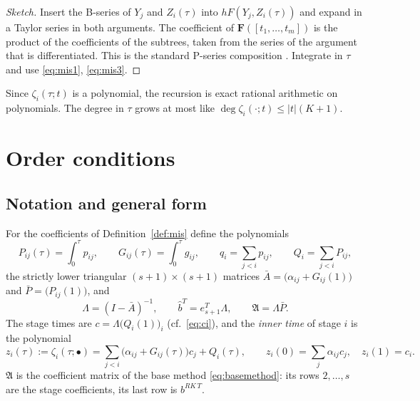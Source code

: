 \documentclass[11pt,a4paper]{article}
\theoremstyle{definition}
\theoremstyle{remark}
\begin{document}
\begin{proof}[Sketch]
Insert the B-series of $Y_j$ and $Z_i(\tau)$ into $hF(Y_j,Z_i(\tau))$
and expand in a Taylor series in both arguments. The coefficient of
$\mathbf F([t_1,\dots,t_m])$ is the product of the coefficients of the
subtrees, taken from the series of the argument that is differentiated.
This is the standard P-series composition \cite{HairerNorsettWanner1993}.
Integrate in $\tau$ and use \eqref{eq:mis1}, \eqref{eq:mis3}.
\end{proof}

Since $\zeta_i(\tau;t)$ is a polynomial, the recursion is exact
rational arithmetic on polynomials. The degree in $\tau$ grows at most
like $\deg\zeta_i(\cdot;t)\le |t|(K+1)$.

\section{Order conditions}
\label{sec:orderconditions}

\subsection{Notation and general form}

For the coefficients of Definition~\ref{def:mis} define the polynomials
\begin{equation*}
 P_{ij}(\tau)=\int_0^\tau p_{ij},\qquad G_{ij}(\tau)=\int_0^\tau g_{ij},\qquad
 q_i=\sum_{j<i}p_{ij},\qquad Q_i=\sum_{j<i}P_{ij},
\end{equation*}
the strictly lower triangular $(s+1)\times(s+1)$ matrices
$\bar A=\big(\alpha_{ij}+G_{ij}(1)\big)$ and $\bar P=\big(P_{ij}(1)\big)$,
and
\begin{equation*}
 \Lambda=(I-\bar A)^{-1},\qquad \hat b^T=e_{s+1}^T\Lambda,\qquad
 \mathfrak A=\Lambda\bar P .
\end{equation*}
The stage times are $c=\Lambda\big(Q_i(1)\big)_i$ (cf.\ \eqref{eq:ci}),
and the \emph{inner time} of stage $i$ is the polynomial
\begin{equation*}
 z_i(\tau):=\zeta_i(\tau;\bullet)=\sum_{j<i}\big(\alpha_{ij}+G_{ij}(\tau)\big)c_j+Q_i(\tau),
 \qquad z_i(0)=\sum_j\alpha_{ij}c_j,\quad z_i(1)=c_i .
\end{equation*}
$\mathfrak A$ is the coefficient matrix of the base method
\eqref{eq:basemethod}: its rows $2,\dots,s$ are the stage coefficients,
its last row is $b^{RK\,T}$.
\end{document}
